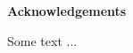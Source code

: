 \newpage
\thispagestyle{plain}
    \begin{center}
    
        \vspace*{0.1cm}
        \Large
        \textbf{Acknowledgements}\\
        \vspace{0.5cm}
        
    \end{center}

Some text ...